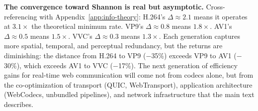 \textbf{The convergence toward Shannon is real but asymptotic.}
Cross-referencing with Appendix~\ref{app:info-theory}: H.264's
$\Delta \approx 2.1$ means it operates at $3.1\times$ the theoretical
minimum rate. VP9's $\Delta \approx 0.8$ means $1.8\times$. AV1's
$\Delta \approx 0.5$ means $1.5\times$. VVC's $\Delta \approx 0.3$ means
$1.3\times$. Each generation captures more spatial, temporal, and
perceptual redundancy, but the returns are diminishing: the distance from
H.264 to VP9 ($-$35\%) exceeds VP9 to AV1 ($-$30\%), which exceeds AV1 to
VVC ($-$17\%). The next generation of efficiency gains for real-time web
communication will come not from codecs alone, but from the co-optimization
of transport (QUIC, WebTransport), application architecture (WebCodecs,
unbundled pipelines), and network infrastructure that the main text
describes.
